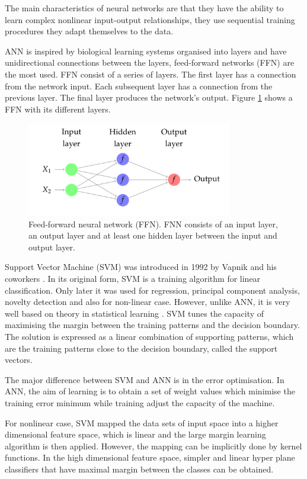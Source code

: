 The main characteristics of neural networks are that they have the ability to learn
complex nonlinear input-output relationships, they use sequential training procedures 
they adapt themselves to the data.

ANN is inspired by biological learning systems organised into layers and have unidirectional connections between the layers, feed-forward networks  (FFN) are the most used.  FFN consist of a series of layers. The first layer has a connection from the network input. Each subsequent layer has a connection from the previous layer. The final layer produces the network's output. Figure \ref{fig:ffn} shows a FFN with its different layers.

\begin{figure}[!h]
  \centering
  \includegraphics[width=0.8\textwidth]{img/ffn}
  \caption{Feed-forward neural network (FFN). FNN consists of an input layer, an output layer and at least one hidden layer between the input and output layer. }
  \label{fig:ffn}
\end{figure}


Support Vector Machine (SVM) was introduced in 1992 by Vapnik and his coworkers
\cite{boser1992}. In its original form, SVM is a training algorithm for linear classification. Only later it was used for regression, principal component analysis, novelty detection and also for non-linear case.  However, unlike ANN, it is very well 
based on theory in statistical learning \cite{cortes1995}.  SVM tunes the capacity of 
maximising the margin between the training patterns and the decision boundary. The
solution is expressed as a linear combination of supporting patterns, which are the training patterns close to the decision boundary, called the support vectors.

The major difference between SVM and ANN is in the error optimisation. In ANN, the aim of learning is to obtain a set of weight values which minimise the training error 
minimum while training adjust the capacity of the machine. 

For nonlinear case, SVM mapped the data sets of input space into a higher dimensional feature space, which is linear and the large margin learning algorithm is then applied. However, the mapping can be implicitly done by kernel functions. In the high dimensional feature space, simpler and linear hyper plane classifiers that have maximal margin between the classes can be obtained.

